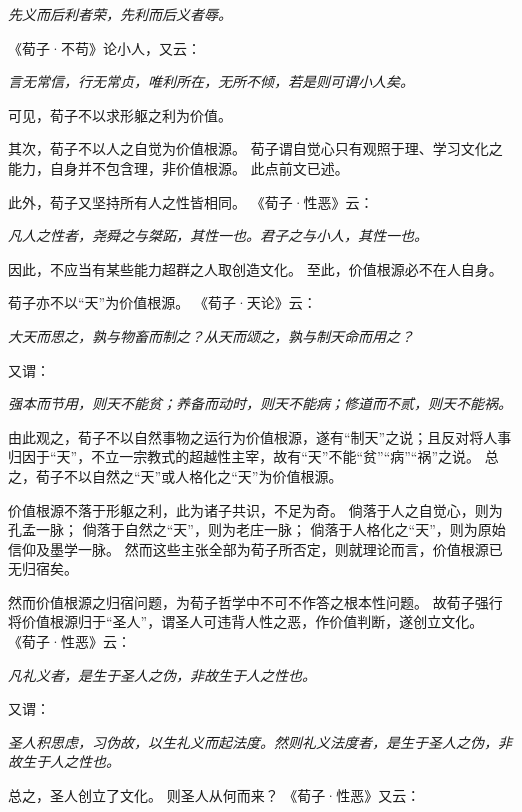 \documentclass[11pt]{article}
\begin{document}
\textit{先义而后利者荣，先利而后义者辱。}

《荀子·不苟》论小人，又云：

\textit{言无常信，行无常贞，唯利所在，无所不倾，若是则可谓小人矣。}

可见，荀子不以求形躯之利为价值。

\par

其次，荀子不以人之自觉为价值根源。
荀子谓自觉心只有观照于理、学习文化之能力，自身并不包含理，非价值根源。
此点前文已述。

\par

此外，荀子又坚持所有人之性皆相同。
《荀子·性恶》云：

\textit{凡人之性者，尧舜之与桀跖，其性一也。君子之与小人，其性一也。}

因此，不应当有某些能力超群之人取创造文化。
至此，价值根源必不在人自身。

\par

荀子亦不以“天”为价值根源。
《荀子·天论》云：

\textit{大天而思之，孰与物畜而制之？从天而颂之，孰与制天命而用之？}

又谓：

\textit{强本而节用，则天不能贫；养备而动时，则天不能病；修道而不贰，则天不能祸。}

由此观之，荀子不以自然事物之运行为价值根源，遂有“制天”之说；且反对将人事归因于“天”，不立一宗教式的超越性主宰，故有“天”不能“贫”“病”“祸”之说。
总之，荀子不以自然之“天”或人格化之“天”为价值根源。

\par

价值根源不落于形躯之利，此为诸子共识，不足为奇。
倘落于人之自觉心，则为孔孟一脉；
倘落于自然之“天”，则为老庄一脉；
倘落于人格化之“天”，则为原始信仰及墨学一脉。
然而这些主张全部为荀子所否定，则就理论而言，价值根源已无归宿矣。

\par

然而价值根源之归宿问题，为荀子哲学中不可不作答之根本性问题。
故荀子强行将价值根源归于“圣人”，谓圣人可违背人性之恶，作价值判断，遂创立文化。
《荀子·性恶》云：

\textit{凡礼义者，是生于圣人之伪，非故生于人之性也。}

又谓：

\textit{圣人积思虑，习伪故，以生礼义而起法度。然则礼义法度者，是生于圣人之伪，非故生于人之性也。}

总之，圣人创立了文化。
则圣人从何而来？
《荀子·性恶》又云：
\end{document}
